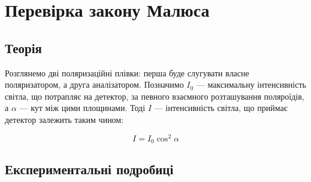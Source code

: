 









	\newcommand{\MyNumber}{7}
	\newcommand{\MyTitle}{Вивчення поляризованого світла}
	
		\section{Перевірка закону Малюса}
	\subsection{Теорія}
	
	Розглянемо дві поляризаційні плівки: перша буде слугувати власне поляризатором, а друга аналізатором. Позначимо $Ι_0$ --- максимальну інтенсивність світла, що потрапляє на детектор, за певного взаємного розташування поляроїдів, а $\alpha$ --- кут між цими площинами. Тоді $I$ --- інтенсивність світла, що приймає детектор залежить таким чином:
	
	\begin{equation}
		\label{eq:MalusLaw}
		I=I_0\cos^2{\alpha}
	\end{equation}
	
	\subsection{Експериментальні подробиці}
	

